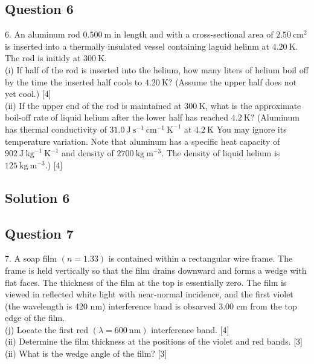 \documentclass{article}
\begin{document}
\subsection{Question 6}
6. An aluminum rod $0.500 \mathrm{~m}$ in length and with a cross-sectional area of $2.50 \mathrm{~cm}^{2}$ is inserted into a thermally insulated vessel containing laguid helinm at $4.20 \mathrm{~K}$. The rod is initidy at $300 \mathrm{~K}$. \\
(i) If half of the rod is inserted into the helium, how many liters of helium boil off by the time the inserted half cools to $4.20 \mathrm{~K} ?$ (Assume the upper half does not yet cool.) [4] \\
(ii) If the upper end of the rod is maintained at $300 \mathrm{~K}$, what is the approximate boil-off rate of liquid helium after the lower half has reached $4.2 \mathrm{~K} ?$ (Aluminum has thermal conductivity of $31.0 \mathrm{~J} \mathrm{~s}^{-1} \mathrm{~cm}^{-1} \mathrm{~K}^{-1}$ at $4.2 \mathrm{~K}$ You may ignore its temperature variation. Note that aluminum has a specific heat capacity of $902 \mathrm{~J~kg}^{-1} \mathrm{~K}^{-1}$ and density of $2700 \mathrm{~kg} \mathrm{~m}^{-3}$. The density of liquid helium is $125 \mathrm{~kg} \mathrm{~m}^{-3}$.) [4] \\


\subsection{Solution 6}


\subsection{Question 7}

7. A soap film $(n=1.33)$ is contained within a rectangular wire frame. The frame is held vertically so that the film drains downward and forms a wedge with flat faces. The thickness of the film at the top is essentially zero. The film is viewed in reflected white light with near-normal incidence, and the first violet (the wavelength is 420 nm) interference band is obsarved $3.00$ cm from the top edge of the film. \\
(j) Locate the first red $(\lambda=600 \mathrm{~nm})$ interference band. [4] \\
(ii) Determine the film thickness at the positions of the violet and red bands. [3] \\
(ii) What is the wedge angle of the film? [3] \\
\end{document}
